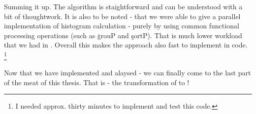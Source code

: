     Summing it up. The algorithm is staightforward and can be understood with
    a bit of thoughtwork. It is also to be noted - that we were able
    to give a parallel implementation of histogram calculation - purely
    by using common functional processing operations (such as \c{grouP} and \c{sortP}).
    That is much lower workload that we had in \man. Overall this makes
    the approach also fast to implement in code.
    \footnote{I needed approx. thirty minutes to implement and test this code.}
    
    
    Now that we have implemented and alaysed \ndpn - we can finally come
    to the last part of the meat of this thesis. That is - the
    transformation of \ndpn to \ndpv!
      
  
  
      
    
  

